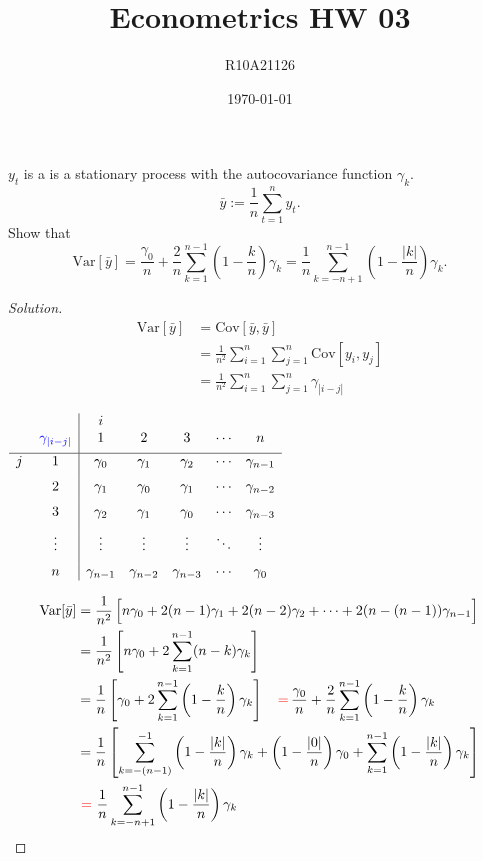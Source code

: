\documentclass[UTF8,a4paper,14pt]{ctexart}
\title{{Econometrics HW 03}}
\author{R10A21126}
\date{\today}
\newcommand{\Var}{\mathrm{Var}}
\newcommand{\Cov}{\mathrm{Cov}}
\newenvironment{solution}
  {\renewcommand\qedsymbol{$\blacksquare$}\begin{proof}[Solution]}
  {\end{proof}}
\theoremstyle{definition}
\theoremstyle{remark}
\begin{document}
\begin{Problem}{}
    $y_t$ is a is a stationary process with the autocovariance function $\gamma_k$. 
    \[\bar{y} := \frac{1}{n}\sum_{t=1}^n y_t.\] 
    Show that
    \[\Var[\bar{y}] = \frac{\gamma_0}{n}+\frac{2}{n}\sum_{k = 1}^{n-1}\left(1-\frac{k}{n}\right)\gamma_k = \frac{1}{n}\sum_{k=-n+1}^{n-1}\left(1-\frac{\left\lvert k \right\rvert }{n}\right)\gamma_k .\]
    \end{Problem}
\begin{solution}
    \begin{align*}
        \Var[\bar{y}] &= \Cov[\bar{y},\bar{y}]\\
        &=\frac{1}{n^2}\sum_{i = 1}^{n}\sum_{j = 1}^{n}\Cov[y_i,y_j]\\
        &=\frac{1}{n^2}\sum_{i = 1}^{n}\sum_{j = 1}^{n}\gamma_{\left\lvert i-j \right\rvert }
    \end{align*}
    \begin{center}
        $\begin{array}{c @{\hspace{2\tabcolsep}}c|*{6}{c}}
            & &i\\
           &\textcolor{blue}{\gamma_{\left\lvert i-j \right\rvert}} &1&2&3&\cdots&n
          \\[1ex]
          \hline
          j&1 & \gamma_0 & \gamma_1 & \gamma_2 & \cdots & \gamma_{n-1} \\[6pt]
           &2 & \gamma_1 & \gamma_0 & \gamma_1 & \cdots & \gamma_{n-2} \\[6pt]
           &3 & \gamma_2 & \gamma_1 & \gamma_0 & \cdots & \gamma_{n-3}  \\[6pt]
      &\vdots & \vdots   & \vdots   & \vdots   & \ddots & \vdots \\[6pt]
           &n & \gamma_{n-1} & \gamma_{n-2}  & \gamma_{n-3} & \cdots & \gamma_0
          \end{array}$
    \end{center}
    \begin{align*}
        \Var[\bar{y}] &= \frac{1}{n^2}\,\Bigl[n\gamma_0+2(n-1)\gamma_{1}+2(n-2)\gamma_2+\cdots+2(n-(n-1))\gamma_{n-1}\Bigr]\\
        &=\frac{1}{n^2}\left[n\gamma_0+2\sum_{k=1}^{n-1}(n-k)\gamma_k\right]\\
        &=\frac{1}{n}\left[\gamma_0+2\sum_{k=1}^{n-1}\left(1-\frac{k}{n}\right)\gamma_k\right] 
        \quad\textcolor{red}{{=}}\,\frac{\gamma_0}{n}+\frac{2}{n}\sum_{k=1}^{n-1}\left(1-\frac{k}{n}\right)\gamma_k\\
        &=\frac{1}{n}\left[\sum_{k=-(n-1)}^{-1}\left(1-\frac{|k|}{n}\right)\gamma_k+\left(1-\frac{|0|}{n}\right)\gamma_0+\sum_{k=1}^{n-1}\left(1-\frac{|k|}{n}\right)\gamma_k\right]\\
        &\,\,\textcolor{red}{{=}}\,\,\frac{1}{n}\sum_{k=-n+1}^{n-1}\left(1-\frac{|k|}{n}\right)\gamma_k
    \end{align*}
    \end{solution} 
\end{document}
